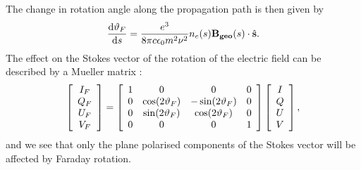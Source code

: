 The change in rotation angle along the
propagation path is then given by
\begin{equation}
  \frac{\mathrm{d} \vartheta_{F}}{\mathrm{d} s}=\frac{e^{3}}{8\pi 
    c\epsilon_{0}m^{2}\nu^{2}}n_{e}(s) {\bf B_{geo}} (s) \cdot 
    \hat{\bf s}. 
 \label{eq:faraday:speed}
\end{equation}
The effect on the Stokes vector of the rotation of the electric field can be
described by a Mueller matrix \citep{goldstein:polar:03,meissner:06:polar}:
\begin{equation}
\left[
\begin{array}{c}
I_{F}\\
Q_{F}\\
U_{F}\\
V_{F}\\
\end{array}
\right]
= \left[
\begin{array}{cccc}
1 & 0 & 0 & 0 \\
0 & \cos(2\vartheta_{F}) & -\sin(2\vartheta_{F}) & 0 \\
0 & \sin(2\vartheta_{F}) & \cos(2\vartheta_{F}) & 0\\
0 & 0 & 0 & 1\\
\end{array}
\right]
\left[
\begin{array}{c}
I\\
Q\\
U\\
V\\
\end{array}
\right], 
\label{eq:faraday:mueller}
\end{equation}
and we see that only the plane polarised components of the Stokes vector will
be affected by Faraday rotation.


